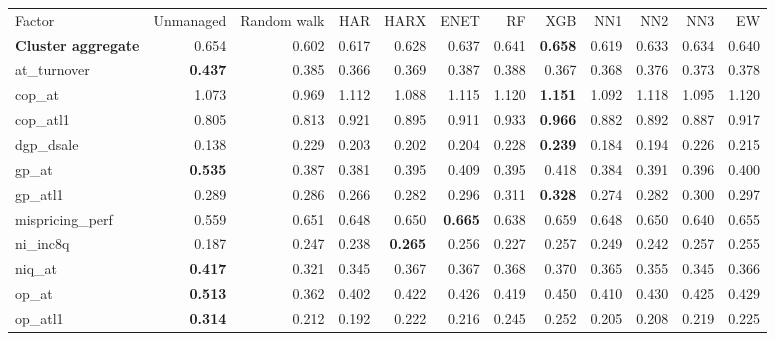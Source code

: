\begin{landscape}
\begin{longtable}{>{\raggedright\arraybackslash}p{2.6cm}rrrrrrrrrrr}
\hline
\multicolumn{12}{@{}l}{\textit{Panel I. Quality}} \\
\hline
Factor & Unmanaged & Random walk & HAR & HARX & ENET & RF & XGB & NN1 & NN2 & NN3 & EW \\
\hline
\textbf{Cluster aggregate} & 0.654 & 0.602 & 0.617 & 0.628 & 0.637 & 0.641 & \textbf{\cellcolor{blue!10}0.658} & 0.619 & 0.633 & 0.634 & 0.640 \\
at\_turnover & \textbf{0.437} & 0.385 & 0.366 & 0.369 & 0.387 & 0.388 & 0.367 & 0.368 & 0.376 & 0.373 & 0.378 \\
cop\_at & 1.073 & 0.969 & \cellcolor{blue!10}1.112 & \cellcolor{blue!10}1.088 & \cellcolor{blue!10}1.115 & \cellcolor{blue!10}1.120 & \textbf{\cellcolor{blue!10}1.151} & \cellcolor{blue!10}1.092 & \cellcolor{blue!10}1.118 & \cellcolor{blue!10}1.095 & \cellcolor{blue!10}1.120 \\
cop\_atl1 & 0.805 & 0.813 & \cellcolor{blue!10}0.921 & \cellcolor{blue!10}0.895 & \cellcolor{blue!10}0.911 & \cellcolor{blue!10}0.933 & \textbf{\cellcolor{blue!10}0.966} & \cellcolor{blue!10}0.882 & \cellcolor{blue!10}0.892 & \cellcolor{blue!10}0.887 & \cellcolor{blue!10}0.917 \\
dgp\_dsale & 0.138 & 0.229 & 0.203 & 0.202 & 0.204 & 0.228 & \textbf{\cellcolor{blue!10}0.239} & 0.184 & 0.194 & 0.226 & 0.215 \\
gp\_at & \textbf{0.535} & 0.387 & 0.381 & 0.395 & 0.409 & 0.395 & 0.418 & 0.384 & 0.391 & 0.396 & 0.400 \\
gp\_atl1 & 0.289 & 0.286 & 0.266 & 0.282 & \cellcolor{blue!10}0.296 & \cellcolor{blue!10}0.311 & \textbf{\cellcolor{blue!10}0.328} & 0.274 & 0.282 & \cellcolor{blue!10}0.300 & \cellcolor{blue!10}0.297 \\
mispricing\_perf & 0.559 & 0.651 & 0.648 & 0.650 & \textbf{\cellcolor{blue!10}0.665} & 0.638 & \cellcolor{blue!10}0.659 & 0.648 & 0.650 & 0.640 & \cellcolor{blue!10}0.655 \\
ni\_inc8q & 0.187 & 0.247 & 0.238 & \textbf{\cellcolor{blue!10}0.265} & \cellcolor{blue!10}0.256 & 0.227 & \cellcolor{blue!10}0.257 & \cellcolor{blue!10}0.249 & 0.242 & \cellcolor{blue!10}0.257 & \cellcolor{blue!10}0.255 \\
niq\_at & \textbf{0.417} & 0.321 & 0.345 & 0.367 & 0.367 & 0.368 & 0.370 & 0.365 & 0.355 & 0.345 & 0.366 \\
op\_at & \textbf{0.513} & 0.362 & 0.402 & 0.422 & 0.426 & 0.419 & 0.450 & 0.410 & 0.430 & 0.425 & 0.429 \\
op\_atl1 & \textbf{0.314} & 0.212 & 0.192 & 0.222 & 0.216 & 0.245 & 0.252 & 0.205 & 0.208 & 0.219 & 0.225 \\

\end{longtable}
\end{landscape}
